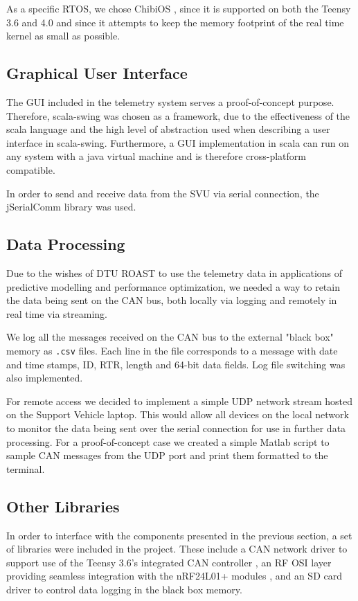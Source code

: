 \documentclass[conference]{IEEEtran}
\begin{document}
As a specific RTOS, we chose ChibiOS \cite{chibios}, since it is supported on both the Teensy 3.6 and 4.0 and since it attempts to keep the memory footprint of the real time kernel as small as possible.

\subsection{Graphical User Interface} %

The GUI included in the telemetry system serves a proof-of-concept purpose. Therefore, scala-swing \cite{scala-swing} was chosen as a framework, due to the effectiveness of the scala \cite{scala} language and the high level of abstraction used when describing a user interface in scala-swing. Furthermore, a GUI implementation in scala can run on any system with a java virtual machine and is therefore cross-platform compatible.

In order to send and receive data from the SVU via serial connection, the jSerialComm \cite{jSerialComm} library was used.

\subsection{Data Processing} %
Due to the wishes of DTU ROAST to use the telemetry data in applications of predictive modelling and performance optimization, we needed a way to retain the data being sent on the CAN bus, both locally via logging and remotely in real time via streaming. 

We log all the messages received on the CAN bus to the external "black box" memory as \texttt{.csv} files. Each line in the file corresponds to a message with date and time stamps, ID, RTR, length and 64-bit data fields.  Log file switching was also implemented. 

For remote access we decided to implement a simple UDP network stream hosted on the Support Vehicle laptop. This would allow all devices on the local network to monitor the data being sent over the serial connection for use in further data processing. For a proof-of-concept case we created a simple Matlab script to sample CAN messages from the UDP port and print them formatted to the terminal. 

\subsection{Other Libraries}
In order to interface with the components presented in the previous section, a set of libraries were included in the project. These include a CAN network driver to support use of the Teensy 3.6's integrated CAN controller \cite{ACAN}, an RF OSI layer providing seamless integration with the nRF24L01+ modules \cite{nrfLib}, and an SD card driver \cite{sdfatlib} to control data logging in the black box memory. 
\end{document}
